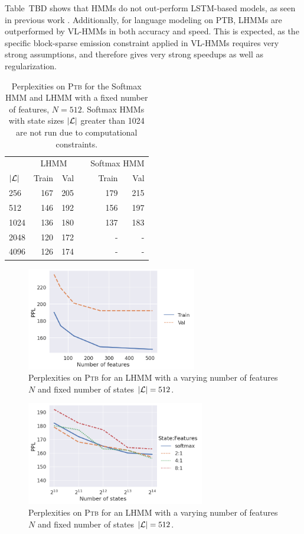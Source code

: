 \documentclass{article}
\begin{document}
Table~TBD shows that HMMs do not out-perform LSTM-based models,
as seen in previous work \citep{chiu2020scaling}.
Additionally, for language modeling on \textsc{PTB},
LHMMs are outperformed by VL-HMMs \citep{chiu2020scaling} in both accuracy and speed.
This is expected, as the specific block-sparse emission constraint applied in VL-HMMs
requires very strong assumptions, and therefore gives very strong speedups as well
as regularization.

\begin{table}[!t]
\centering
\begin{tabular}{lrrcrr}
\toprule
& \multicolumn{2}{c}{LHMM} && \multicolumn{2}{c}{Softmax HMM}\\
\cmidrule{2-3} \cmidrule{5-6}
$|\mathcal{L}|$ & Train & Val && Train & Val\\
\midrule
256  & 167 & 205 && 179 & 215\\
512  & 146 & 192 && 156 & 197\\
1024 & 136 & 180 && 137 & 183 \\
2048 & 120 & 172 && -   & -\\
4096 & 126 & 174 && -   & - \\
\bottomrule
\end{tabular}
\caption{\label{tbl:hmm-ppl-states}
Perplexities on \textsc{Ptb} for the Softmax HMM and LHMM with a fixed number of features, $N = 512$.
Softmax HMMs with state sizes $|\mathcal{L}|$ greater than 1024 are not run due to computational constraints.
}
\end{table}

\begin{figure}[t]
\centering
\includegraphics[height=4.5cm]{imgs/hmm/hmm-ppl-features.png}
\caption{
\label{fig:hmm-ppl-features}
Perplexities on \textsc{Ptb} for an LHMM with a varying number of features $N$ and fixed number of states $|\mathcal{L}|=512$.
}
\end{figure}

\begin{figure}[t]
\centering
\includegraphics[height=4.5cm]{imgs/hmm/lhmm-states-features.png}
\caption{
\label{fig:hmm-ppl-features}
Perplexities on \textsc{Ptb} for an LHMM with a varying number of features $N$ and fixed number of states $|\mathcal{L}|=512$.
}
\end{figure}
\end{document}
